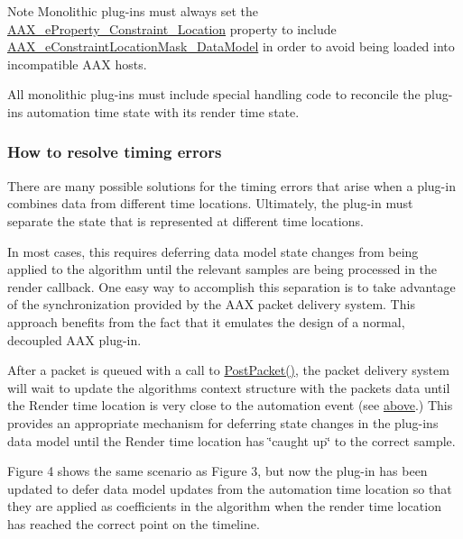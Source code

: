 \begin{DoxyNote}{Note}
Monolithic plug-\/ins must always set the \hyperlink{a00283_a6571f4e41a5dd06e4067249228e2249ea79a0815fea6c8f1a0d8ed511aa88e9ff}{A\+A\+X\+\_\+e\+Property\+\_\+\+Constraint\+\_\+\+Location} property to include \hyperlink{a00206_a0c5d795c1fd021c5b9b541febc34601aa027df08c137702400a92719828bea44b}{A\+A\+X\+\_\+e\+Constraint\+Location\+Mask\+\_\+\+Data\+Model} in order to avoid being loaded into incompatible A\+A\+X hosts.
\end{DoxyNote}
All monolithic plug-\/ins must include special handling code to reconcile the plug-\/in\textquotesingle{}s automation time state with its render time state.\hypertarget{a00351_parameterUpdateTiming_resolvingOffsets}{}\subsubsection{How to resolve timing errors}\label{a00351_parameterUpdateTiming_resolvingOffsets}
There are many possible solutions for the timing errors that arise when a plug-\/in combines data from different time locations. Ultimately, the plug-\/in must separate the state that is represented at different time locations.

In most cases, this requires deferring data model state changes from being applied to the algorithm until the relevant samples are being processed in the render callback. One easy way to accomplish this separation is to take advantage of the synchronization provided by the A\+A\+X packet delivery system. This approach benefits from the fact that it emulates the design of a normal, decoupled A\+A\+X plug-\/in.

After a packet is queued with a call to \hyperlink{a00090_ae5dd2b5925dbc181513bca1c4ac5e716}{Post\+Packet()}, the packet delivery system will wait to update the algorithm\textquotesingle{}s context structure with the packet\textquotesingle{}s data until the Render time location is very close to the automation event (see \hyperlink{a00351_parameterUpdateTiming_packet_delivery}{above}.) This provides an appropriate mechanism for deferring state changes in the plug-\/in\textquotesingle{}s data model until the Render time location has \char`\"{}caught up\char`\"{} to the correct sample.

Figure 4 shows the same scenario as Figure 3, but now the plug-\/in has been updated to defer data model updates from the automation time location so that they are applied as coefficients in the algorithm when the render time location has reached the correct point on the timeline.

